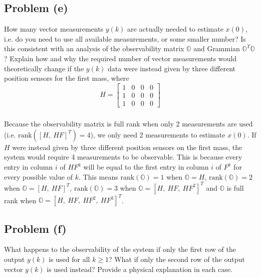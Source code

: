 \documentclass[11pt]{article}
\begin{document}
\subsection*{Problem (e)}
How many vector measurements $y(k)$ are actually needed to estimate $x(0)$, i.e. do you need to use all available measurements, or some smaller number? Is this consistent with an analysis of the observability matrix $\mathbb{O}$ and Grammian $\mathbb{O}^T\mathbb{O}$? Explain how and why the required number of vector measurements would theoretically change if the $y(k)$ data were instead given by three different position sensors for the first mass, where 
\begin{equation*}
	H=\begin{bmatrix} 1&0&0&0 \\ 1&0&0&0 \\ 1&0&0&0 \end{bmatrix}
\end{equation*}

\subparagraph*{}
Because the observability matrix is full rank when only 2 measurements are used (i.e. $\text{rank}([H,\ HF]^T)=4$), we only need 2 measurements to estimate $x(0)$. If $H$ were instead given by three different position sensors on the first mass, the system would require 4 measurements to be observable. This is because every entry in column $i$ of $HF^k$ will be equal to the first entry in column $i$ of $F^k$ for every possible value of $k$. This means $\text{rank}(\mathbb{O})=1$ when $\mathbb{O}=H$, $\text{rank}(\mathbb{O})=2$ when $\mathbb{O}=[H,\ HF]^T$, $\text{rank}(\mathbb{O})=3$ when $\mathbb{O}=[H,\ HF,\ HF^2]^T$ and $\mathbb{O}$ is full rank when $\mathbb{O}=[H,\ HF,\ HF^2,\ HF^3]^T$.

\subsection*{Problem (f)}
What happens to the observability of the system if only the first row of the output $y(k)$ is used for all $k\geq 1$? What if only the second row of the output vector $y(k)$ is used instead? Provide a physical explanation in each case.
\end{document}
